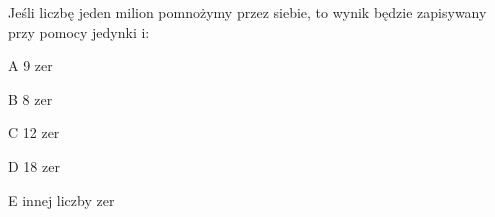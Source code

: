 \begin{tresc}
Jeśli liczbę jeden milion pomnożymy przez siebie, to wynik będzie zapisywany przy pomocy jedynki i:
\end{tresc}
\begin{wariant}{A} 9 zer \end{wariant}
\begin{wariant}{B} 8 zer \end{wariant}
\begin{wariant}{C} 12 zer \end{wariant}
\begin{wariant}{D} 18 zer \end{wariant}
\begin{wariant}{E} innej liczby zer \end{wariant}
